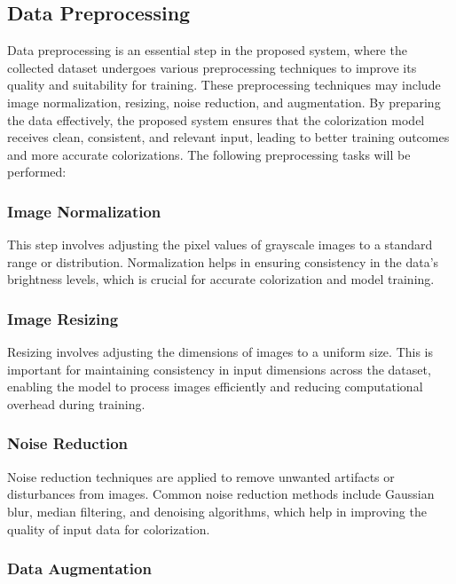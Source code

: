\subsection{Data Preprocessing}

Data preprocessing is an essential step in the proposed system, where the collected dataset undergoes various preprocessing techniques to improve its quality and suitability for training. These preprocessing techniques may include image normalization, resizing, noise reduction, and augmentation. By preparing the data effectively, the proposed system ensures that the colorization model receives clean, consistent, and relevant input, leading to better training outcomes and more accurate colorizations. The following preprocessing tasks will be performed:

\subsubsection{Image Normalization}

This step involves adjusting the pixel values of grayscale images to a standard range or distribution. Normalization helps in ensuring consistency in the data's brightness levels, which is crucial for accurate colorization and model training.



\subsubsection{Image Resizing}

Resizing involves adjusting the dimensions of images to a uniform size. This is important for maintaining consistency in input dimensions across the dataset, enabling the model to process images efficiently and reducing computational overhead during training.



\subsubsection{Noise Reduction}

Noise reduction techniques are applied to remove unwanted artifacts or disturbances from images. Common noise reduction methods include Gaussian blur, median filtering, and denoising algorithms, which help in improving the quality of input data for colorization.

\subsubsection{Data Augmentation}

